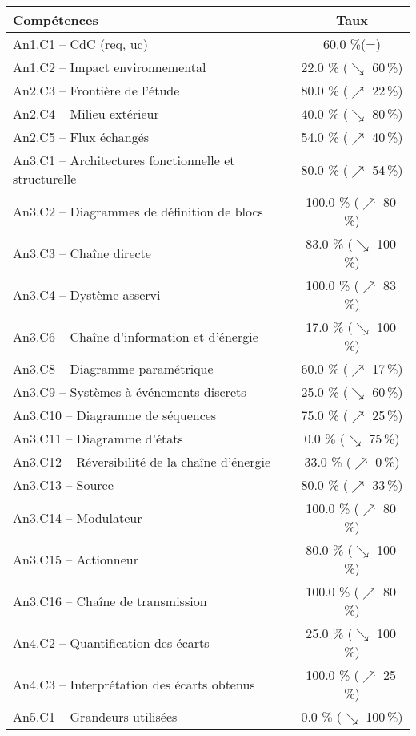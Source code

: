 \footnotesize 
\begin{center} 
\begin{tabular}{|p{.7\linewidth}|c|} 
\hline 
Compétences  & Taux \\ \hline \hline 
An1.C1 -- CdC (req, uc)&60.0 \%(=)\\ \hline 
An1.C2 -- Impact environnemental&22.0 \% ($\searrow$ 60\,\%)\\ \hline 
An2.C3 -- Frontière de l’étude&80.0 \% ($\nearrow$ 22\,\%)\\ \hline 
An2.C4 -- Milieu extérieur&40.0 \% ($\searrow$ 80\,\%)\\ \hline 
An2.C5 -- Flux échangés&54.0 \% ($\nearrow$ 40\,\%)\\ \hline 
An3.C1 -- Architectures fonctionnelle et structurelle&80.0 \% ($\nearrow$ 54\,\%)\\ \hline 
An3.C2 -- Diagrammes de définition de blocs&100.0 \% ($\nearrow$ 80\,\%)\\ \hline 
An3.C3 -- Chaîne directe&83.0 \% ($\searrow$ 100\,\%)\\ \hline 
An3.C4 -- Dystème asservi&100.0 \% ($\nearrow$ 83\,\%)\\ \hline 
An3.C6 -- Chaîne d’information et d'énergie&17.0 \% ($\searrow$ 100\,\%)\\ \hline 
An3.C8 -- Diagramme paramétrique&60.0 \% ($\nearrow$ 17\,\%)\\ \hline 
An3.C9 -- Systèmes à événements discrets&25.0 \% ($\searrow$ 60\,\%)\\ \hline 
An3.C10 -- Diagramme de séquences&75.0 \% ($\nearrow$ 25\,\%)\\ \hline 
An3.C11 -- Diagramme d’états&0.0 \% ($\searrow$ 75\,\%)\\ \hline 
An3.C12 -- Réversibilité de la chaîne d’énergie&33.0 \% ($\nearrow$ 0\,\%)\\ \hline 
An3.C13 -- Source&80.0 \% ($\nearrow$ 33\,\%)\\ \hline 
An3.C14 -- Modulateur&100.0 \% ($\nearrow$ 80\,\%)\\ \hline 
An3.C15 -- Actionneur&80.0 \% ($\searrow$ 100\,\%)\\ \hline 
An3.C16 -- Chaîne de transmission&100.0 \% ($\nearrow$ 80\,\%)\\ \hline 
An4.C2 -- Quantification des écarts&25.0 \% ($\searrow$ 100\,\%)\\ \hline 
An4.C3 -- Interprétation des écarts obtenus&100.0 \% ($\nearrow$ 25\,\%)\\ \hline 
An5.C1 -- Grandeurs utilisées &0.0 \% ($\searrow$ 100\,\%)\\ \hline 

\end{tabular}
\end{center}
